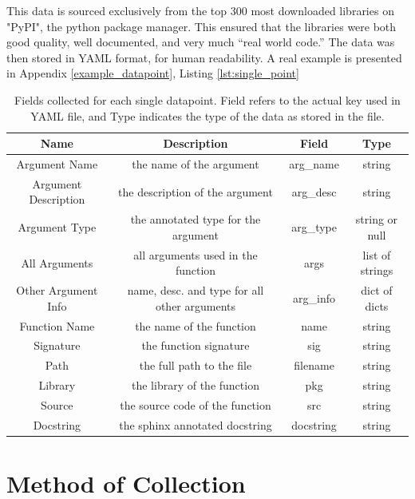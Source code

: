 This data is sourced exclusively from the top 300 most downloaded libraries on "PyPI", the python package manager. 
This ensured that the libraries were both good quality, well documented, and very much ``real world code.''
The data was then stored in YAML format, for human readability. 
A real example is presented in Appendix \ref{example_datapoint}, Listing \ref{lst:single_point}


\begin{table}[h!]
    \begin{center}
    \begin{tabular}{| c | c | c | c |}
    \hline
        Name &  Description     &    Field    & Type  \\
    \hline
        Argument Name & the name of the argument  & arg\_name & string \\
        Argument Description & the description of the argument & arg\_desc & string \\
        Argument Type & the annotated type for the argument & arg\_type & string or null \\
        All Arguments & all arguments used in the function & args & list of strings \\
        Other Argument Info & name, desc. and type for all other arguments & arg\_info & dict of dicts\\
        Function Name & the name of the function & name & string\\
        Signature & the function signature & sig & string\\
        Path & the full path to the file & filename & string \\
        Library & the library of the function & pkg & string\\
        Source & the source code of the function & src & string\\
        Docstring & the sphinx annotated docstring & docstring & string\\

    \hline


    \end{tabular}
    \caption {Fields collected for each single datapoint. Field refers to the actual key used in YAML file, and Type indicates the type of the data as stored in the file.}
    \label{table:metadata}
    \end{center}
\end{table}



\section{Method of Collection} %
\label{sec:method_of_collection}

